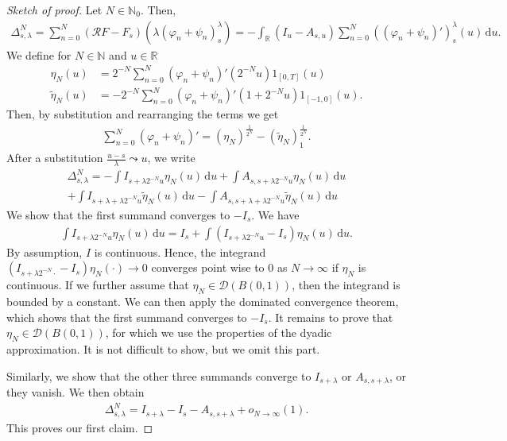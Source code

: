 \begin{proof}[Sketch of proof]
  Let \( N \in \mathbb{N}_0 \). Then, 
  \begin{align*}
    \Delta^N_{s, \lambda} = \sum^N_{n=0} (\mathcal{R}F - F_s)(\lambda(\varphi_n + \psi_n)_s^\lambda) = - \int_{\mathbb{R}} (I_u - A_{s,u}) \sum^N_{n=0} \left( (\varphi_n + \psi_n)' \right)^\lambda_s (u) \, \mathrm{d}u.
  \end{align*}
  We define for \( N \in \mathbb{N} \) and \( u \in \mathbb{R} \)
  \begin{align*}
    \eta_N(u) &= 2^{-N} \sum^N_{n=0}(\varphi_n + \psi_n)'(2^{-N}u )1_{[0,T]}(u) \\
    \tilde \eta_N(u) &= -2^{-N} \sum^N_{n=0}(\varphi_n + \psi_n)'(1 + 2^{-N}u )1_{[-1,0]}(u).
  \end{align*}
  Then, by substitution and rearranging the terms we get
  \begin{align*}
    \sum^N_{n=0}(\varphi_n + \psi_n)' = (\eta_N)^{\frac{1}{2^N}} - (\tilde \eta_N)_1^{\frac{1}{2^N}}.
  \end{align*}
  After a substitution \( \frac{u-s}{\lambda} \leadsto u \), we write 
  \begin{align*}
    \Delta^N_{s,\lambda} = - \int I_{s + \lambda2^{-N}u}\eta_N(u) \, \mathrm{d}u + \int A_{s,s + \lambda2^{-N}u} \eta_N(u) \, \mathrm{d}u \\
    + \int I_{s + \lambda + \lambda2^{-N}u}\tilde \eta_N(u) \, \mathrm{d}u
    - \int  A_{s, s + \lambda + \lambda2^{-N}u} \tilde \eta_N(u) \, \mathrm{d}u 
  \end{align*}
  We show that the first summand converges to \( -I_s \). We have 
  \begin{align*}
    \int I_{s + \lambda2^{-N}u}\eta_N(u) \, \mathrm{d}u = I_s + \int (I_{s + \lambda2^{-N}u} - I_s)\eta_N(u) \, \mathrm{d}u.
  \end{align*}
  By assumption, \( I \) is continuous. Hence, the integrand \( (I_{s + \lambda2^{-N} \cdot} - I_s)\eta_N(\cdot) \to 0 \) converges point wise to \( 0 \) as \( N \to \infty \) if \( \eta_N \) is continuous. If we further assume that \( \eta_N \in \mathcal{D}(B(0,1)) \), then the integrand is bounded by a constant. We can then apply the dominated convergence theorem, which shows that the first summand converges to \( -I_s \).  It remains to prove that \( \eta_N \in \mathcal{D}(B(0,1)) \), for which we use the properties of the dyadic approximation. It is not difficult to show, but we omit this part.

  Similarly, we show that the other three summands converge to \( I_{s + \lambda} \) or \( A_{s, s+\lambda} \), or they vanish. We then obtain 
  \begin{align*}
    \Delta^N_{s, \lambda} = I_{s + \lambda} - I_s - A_{s, s+ \lambda} + o_{N \to \infty}(1).
  \end{align*}
  This proves our first claim.


\end{proof}
